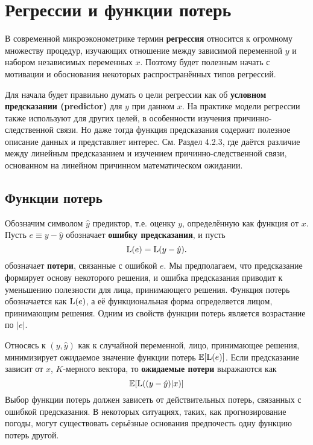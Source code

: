 \section{Регрессии и функции потерь}
В современной микроэконометрике термин \textbf{регрессия} относится к огромному множеству процедур, изучающих отношение между зависимой переменной $y$ и набором независимых переменных $x$. Поэтому будет полезным начать с мотивации и обоснования некоторых распространённых типов регрессий.

Для начала будет правильно думать о цели регрессии как об \textbf{условном предсказании (predictor)} для $y$ при данном $x$. На практике модели регрессии также используют для других целей, в особенности изучения причинно-следственной связи. Но даже тогда функция предсказания содержит полезное описание данных и представляет интерес. См. Раздел 4.2.3, где даётся различие между линейным предсказанием и изучением причинно-следственной связи, основанном на линейном причинном математическом ожидании.

\subsection{Функции потерь}
Обозначим символом $\hat{y}$  предиктор, т.е. оценку $y$, определённую как функция от $x$. Пусть $e \equiv y - \hat{y} $ обозначает \textbf{ошибку предсказания}, и пусть
\begin{equation}
\mathrm{L}(e)=\mathrm{L}(y - \hat{y}).
\end{equation}
обозначает \textbf{потери}, связанные с ошибкой $e$. Мы предполагаем, что предсказание формирует основу некоторого решения, и ошибка предсказания приводит к уменьшению полезности для лица, принимающего решения. Функция потерь обозначается как $\mathrm{L}(e)$, а её функциональная форма определяется лицом, принимающим решения. Одним из свойств функции потерь является возрастание по $|e|$.

Относясь к $(y, \hat{y})$ как к случайной переменной, лицо, принимающее решения, минимизирует ожидаемое значение функции потерь $\mathbb{E}{[\mathrm{L}(e)]}$. Если предсказание зависит от $x$, $K$-мерного вектора, то \textbf{ожидаемые потери} выражаются как
\begin{equation}
\mathbb{E}{[\mathrm{L}((y - \hat{y})|x)]}
\end{equation}
Выбор функции потерь должен зависеть от действительных потерь, связанных с ошибкой предсказания. В некоторых ситуациях, таких, как прогнозирование погоды, могут существовать серьёзные основания предпочесть одну функцию потерь другой.

